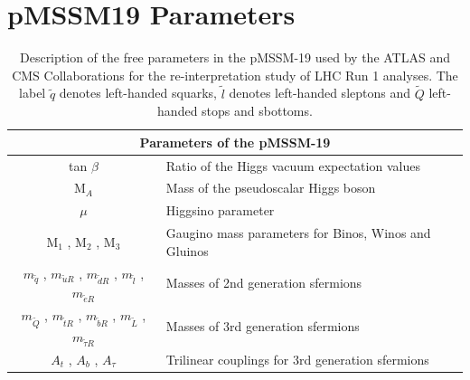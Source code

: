 \documentclass[epj,nopacs,fleqn]{svjour}
\begin{document}
\section{pMSSM19 Parameters}
\begin{table}[!h]
	\center
	\renewcommand{\arraystretch}{1.3}
	\begin{tabular}{ c | l }
		\hline
		\multicolumn{2}{c}{\large \textbf{Parameters of the pMSSM-19}} \\
		\hline \hline
		tan $\beta $ & Ratio of the Higgs vacuum expectation values \\
		M$_A$ & Mass of the pseudoscalar Higgs boson \\
		$\mu$ & Higgsino parameter \\
		M$_1$ , M$_2$ , M$_3$ & Gaugino mass parameters for Binos, Winos and Gluinos \\
		$m_{\tilde q}$ , $m_{\tilde u R}$ , $m_{\tilde d R}$ ,  $m_{\tilde l}$ ,  $m_{\tilde e R}$ & Masses of 2nd generation sfermions \\
		$m_{\tilde Q}$ , $m_{\tilde t R}$ , $m_{\tilde b R}$ , $m_{\tilde L }$ , $m_{\tilde \tau R}$ & Masses of 3rd generation sfermions \\
		$A_t$ , $A_b$ , $A_{\tau}$ & Trilinear couplings for 3rd generation sfermions \\ \hline \hline
	\end{tabular}
	\caption{Description of the free parameters in the pMSSM-19 used by the ATLAS and CMS Collaborations for the re-interpretation study of  LHC Run 1 analyses. The label $\tilde q$ denotes left-handed squarks, $\tilde l$ denotes left-handed sleptons and $\tilde Q$ left-handed stops and sbottoms.}
\end{table}
\label{tab::pMSSM}
\\


\TWO
\end{document}
